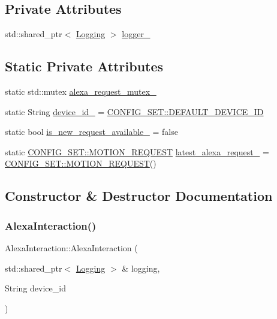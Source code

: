 \subsection*{Private Attributes}
\begin{DoxyCompactItemize}
\item 
std\+::shared\+\_\+ptr$<$ \hyperlink{classLogging}{Logging} $>$ \hyperlink{classAlexaInteraction_adeb8bad9e21b64718a64333e879dd4fa}{logger\+\_\+}
\end{DoxyCompactItemize}
\subsection*{Static Private Attributes}
\begin{DoxyCompactItemize}
\item 
static std\+::mutex \hyperlink{classAlexaInteraction_a958fffc5a4f26ea4b0d0e1c12f4392fd}{alexa\+\_\+request\+\_\+mutex\+\_\+}
\item 
static String \hyperlink{classAlexaInteraction_a3f55a06454bb3dd6cc112620b62e55d3}{device\+\_\+id\+\_\+} = \hyperlink{namespaceCONFIG__SET_a2ac88bd64607d4819d1bda478f469817}{C\+O\+N\+F\+I\+G\+\_\+\+S\+E\+T\+::\+D\+E\+F\+A\+U\+L\+T\+\_\+\+D\+E\+V\+I\+C\+E\+\_\+\+ID}
\item 
static bool \hyperlink{classAlexaInteraction_aef7835ccbb5103bc8e50239e023262ca}{is\+\_\+new\+\_\+request\+\_\+available\+\_\+} = false
\item 
static \hyperlink{structCONFIG__SET_1_1MOTION__REQUEST}{C\+O\+N\+F\+I\+G\+\_\+\+S\+E\+T\+::\+M\+O\+T\+I\+O\+N\+\_\+\+R\+E\+Q\+U\+E\+ST} \hyperlink{classAlexaInteraction_a9b77d3ac70d6d91af2ed19ea8921d174}{latest\+\_\+alexa\+\_\+request\+\_\+} = \hyperlink{structCONFIG__SET_1_1MOTION__REQUEST}{C\+O\+N\+F\+I\+G\+\_\+\+S\+E\+T\+::\+M\+O\+T\+I\+O\+N\+\_\+\+R\+E\+Q\+U\+E\+ST}()
\end{DoxyCompactItemize}


\subsection{Constructor \& Destructor Documentation}
\mbox{\label{classAlexaInteraction_acae42695173d2ad4b9296d64d4a2dbb2}} 
\subsubsection{\texorpdfstring{Alexa\+Interaction()}{AlexaInteraction()}}
{\footnotesize\ttfamily Alexa\+Interaction\+::\+Alexa\+Interaction (\begin{DoxyParamCaption}\item[{std\+::shared\+\_\+ptr$<$ \hyperlink{classLogging}{Logging} $>$ \&}]{logging,  }\item[{String}]{device\+\_\+id }\end{DoxyParamCaption})}



